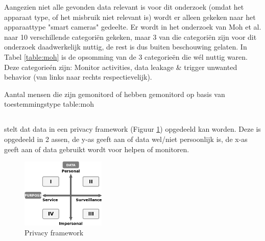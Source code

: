 \documentclass[nonacm,sigconf]{acmart}
\begin{document}
    Aangezien niet alle gevonden data relevant is voor dit onderzoek (omdat het apparaat type, of het misbruik niet relevant is) wordt er alleen gekeken naar het apparaattype "smart cameras" gedeelte.
    Er wordt in het onderzoek van Moh et al. naar 10 verschillende categoriën gekeken, maar 3 van die categoriën zijn voor dit onderzoek daadwerkelijk nuttig, de rest is dus buiten beschouwing gelaten.
    In Tabel \ref{table:moh} is de opsomming van de 3 categorieën die wél nuttig waren.
    Deze categorieén zijn: Monitor activities, data leakage & trigger unwanted behavior (van links naar rechts respectievelijk).

    \SimpleTable{}{}
    {
    }
    \SimpleTable
    {Aantal mensen die zijn gemonitord of hebben gemonitord op basis van toestemmingstype \parencite{moh2023characterizing}}
    {table:moh}
    {
    }



    \subsection{}
    \parencite{van2016privacy} stelt dat data in een privacy framework (Figuur \ref{fig:privacy_framework}) opgedeeld kan worden.
    Deze is opgedeeld in 2 assen, de y-as geeft aan of data wel/niet persoonlijk is, de x-as geeft aan of data gebruikt wordt voor helpen of monitoren.

    \begin{figure}[h]
        \centering
        \includegraphics[width=40mm]{images/SmartCityPrivacy}
        \caption{Privacy framework {\parencite[nagemaakt van][]{van2016privacy}}}
        \label{fig:privacy_framework}
    \end{figure}
\end{document}
